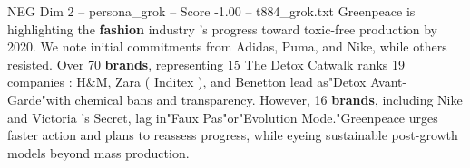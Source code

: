 \begin{textsample}{NEG Dim 2 – persona\_grok – Score -1.00 – t884\_grok.txt}  \label{ex:f2_neg_022}
Greenpeace is highlighting the \textbf{fashion} industry 's progress toward toxic-free production by 2020.
We note initial commitments from Adidas, Puma, and Nike, while others resisted.
Over 70 \textbf{brands}, representing 15 %
The Detox Catwalk ranks 19 companies : H\&M, Zara ( Inditex ), and Benetton lead as"Detox Avant-Garde"with chemical bans and transparency.
However, 16 \textbf{brands}, including Nike and Victoria ’s Secret, lag in"Faux Pas"or"Evolution Mode."Greenpeace urges faster action and plans to reassess progress, while eyeing sustainable post-growth models beyond mass production.

\end{textsample}
